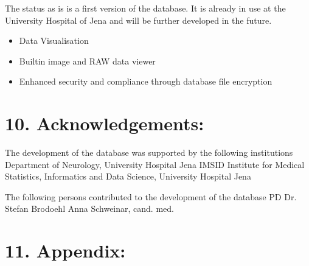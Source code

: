 \documentclass[a4paper,10pt,english]{sphinxmanual}
\begin{document}
\sphinxAtStartPar
The status as is is a first version of the database. It is already in use at the University Hospital of Jena and will be further developed in the future.

\sphinxAtStartPar
{}
\begin{itemize}
\item {} 
\sphinxAtStartPar
Data Visualisation

\item {} 
\sphinxAtStartPar
Built\sphinxhyphen{}in image and RAW data viewer

\item {} 
\sphinxAtStartPar
Enhanced security and compliance through database file encryption

\end{itemize}


\chapter{10. Acknowledgements:}
\label{\detokenize{TechnicalDetails:acknowledgements}}
\sphinxAtStartPar
The development of the database was supported by the following institutions
\sphinxhyphen{} Department of Neurology, University Hospital Jena
\sphinxhyphen{} IMSID \sphinxhyphen{} Institute for Medical Statistics, Informatics and Data Science, University Hospital Jena

\sphinxAtStartPar
The following persons contributed to the development of the database
\sphinxhyphen{} PD Dr. Stefan Brodoehl
\sphinxhyphen{} Anna Schweinar, cand. med.


\chapter{11. Appendix:}
\label{\detokenize{TechnicalDetails:appendix}}


\renewcommand{\indexname}{Index}
\printindex
\end{document}
